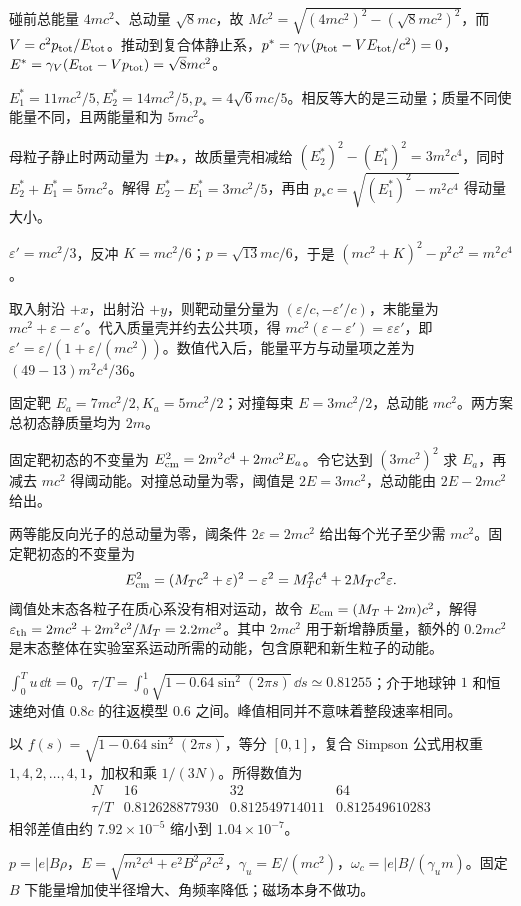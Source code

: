 \begin{bookexercises}
碰前总能量 $4mc^2$、总动量 $\sqrt8mc$，故 $Mc^2=\sqrt{(4mc^2)^2-(\sqrt8mc^2)^2}$，而 $V=c^2p_{\rm tot}/E_{\rm tot}$。推动到复合体静止系，$p^*=\gamma_V(p_{\rm tot}-VE_{\rm tot}/c^2)=0$，$E^*=\gamma_V(E_{\rm tot}-Vp_{\rm tot})=\sqrt8mc^2$。
\item $E_1^*=11mc^2/5,E_2^*=14mc^2/5,p_*=4\sqrt6mc/5$。相反等大的是三动量；质量不同使能量不同，且两能量和为 $5mc^2$。

母粒子静止时两动量为 $\pm\boldsymbol{p}_*$，故质量壳相减给 $(E_2^*)^2-(E_1^*)^2=3m^2c^4$，同时 $E_2^*+E_1^*=5mc^2$。解得 $E_2^*-E_1^*=3mc^2/5$，再由 $p_*c=\sqrt{(E_1^*)^2-m^2c^4}$ 得动量大小。
\item $\varepsilon'=mc^2/3$，反冲 $K=mc^2/6$；$p=\sqrt{13}mc/6$，于是 $(mc^2+K)^2-p^2c^2=m^2c^4$。

取入射沿 $+x$，出射沿 $+y$，则靶动量分量为 $(\varepsilon/c,-\varepsilon'/c)$，末能量为 $mc^2+\varepsilon-\varepsilon'$。代入质量壳并约去公共项，得 $mc^2(\varepsilon-\varepsilon')=\varepsilon\varepsilon'$，即 $\varepsilon'=\varepsilon/(1+\varepsilon/(mc^2))$。数值代入后，能量平方与动量项之差为 $(49-13)m^2c^4/36$。
\item 固定靶 $E_a=7mc^2/2,K_a=5mc^2/2$；对撞每束 $E=3mc^2/2$，总动能 $mc^2$。两方案总初态静质量均为 $2m$。

固定靶初态的不变量为 $E_{\rm cm}^2=2m^2c^4+2mc^2E_a$。令它达到 $(3mc^2)^2$ 求 $E_a$，再减去 $mc^2$ 得阈动能。对撞总动量为零，阈值是 $2E=3mc^2$，总动能由 $2E-2mc^2$ 给出。
\item 两等能反向光子的总动量为零，阈条件 $2\varepsilon=2mc^2$ 给出每个光子至少需 $mc^2$。固定靶初态的不变量为
\[
E_{\rm cm}^2=(M_Tc^2+\varepsilon)^2-\varepsilon^2
=M_T^2c^4+2M_Tc^2\varepsilon .
\]
阈值处末态各粒子在质心系没有相对运动，故令 $E_{\rm cm}=(M_T+2m)c^2$，解得 $\varepsilon_{\rm th}=2mc^2+2m^2c^2/M_T=2.2mc^2$。其中 $2mc^2$ 用于新增静质量，额外的 $0.2mc^2$ 是末态整体在实验室系运动所需的动能，包含原靶和新生粒子的动能。
\item $\int_0^T u\,\dd t=0$。$\tau/T=\int_0^1\sqrt{1-0.64\sin^2(2\pi s)}\,\dd s\simeq0.81255$；介于地球钟 $1$ 和恒速绝对值 $0.8c$ 的往返模型 $0.6$ 之间。峰值相同并不意味着整段速率相同。

以 $f(s)=\sqrt{1-0.64\sin^2(2\pi s)}$，等分 $[0,1]$，复合 Simpson 公式用权重 $1,4,2,\ldots,4,1$，加权和乘 $1/(3N)$。所得数值为
\[
\begin{array}{c|ccc}
N & 16 & 32 & 64\\ \hline
\tau/T & 0.812628877930 & 0.812549714011 & 0.812549610283
\end{array}
\]
相邻差值由约 $7.92\times10^{-5}$ 缩小到 $1.04\times10^{-7}$。
\item $p=|e|B\rho$，$E=\sqrt{m^2c^4+e^2B^2\rho^2c^2}$，$\gamma_u=E/(mc^2)$，$\omega_c=|e|B/(\gamma_um)$。固定 $B$ 下能量增加使半径增大、角频率降低；磁场本身不做功。


\end{bookexercises}

